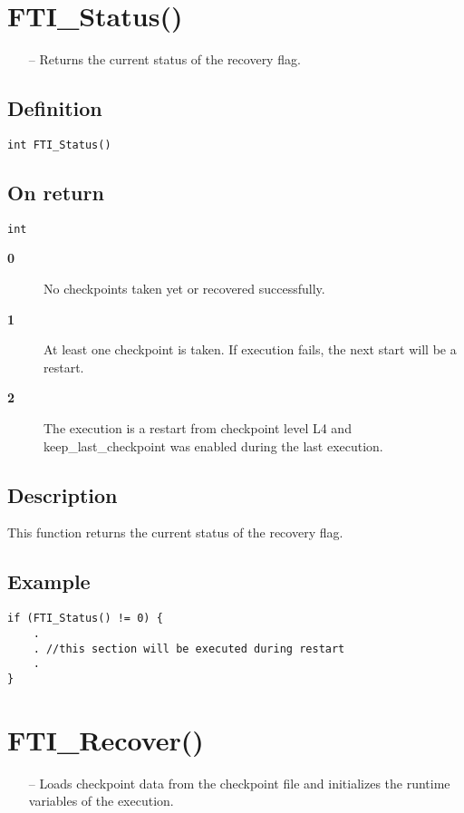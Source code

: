 \documentclass{refrep}
\begin{document}
\section{\asciifamily FTI\_Status()}\label{sec:ftistatus}
\begin{framed}
\begin{itemize}
\item[--] Returns the current status of the recovery flag.
\end{itemize}
\end{framed}
\subsection*{Definition}
\begin{lstlisting}[frame=single]
int FTI_Status()
\end{lstlisting}
\subsection*{On return}
\begin{lstlisting}[frame=single]
int
\end{lstlisting}
\begin{description}
\item[\textbf{0}] No checkpoints taken yet or recovered successfully.
\item[\textbf{1}] At least one checkpoint is taken. If execution fails, the next start will be a restart.
\item[\textbf{2}] The execution is a restart from checkpoint level L4 and keep\_last\_checkpoint was enabled during the last execution.
\end{description}
\subsection*{Description}
This function returns the current status of the recovery flag.
\subsection*{Example}
\begin{center}
\begin{lstlisting}[frame=single]
if (FTI_Status() != 0) {
    .
    . //this section will be executed during restart
    .
}
\end{lstlisting}
\end{center}
\newpage
\section{\asciifamily FTI\_Recover()}\label{sec:ftirecover}
\begin{framed}
\begin{itemize}
\item[--] Loads checkpoint data from the checkpoint file and initializes the runtime variables of the execution.
\end{itemize}
\end{framed}
\end{document}
